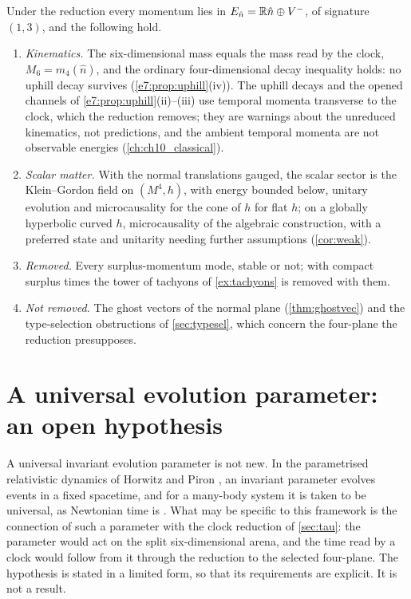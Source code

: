Under the reduction every momentum lies in $E_{\hat n}=\mathbb{R}\hat n\oplus V^-$, of signature $(1,3)$, and the following hold.
\begin{enumerate}[label=(\roman*),leftmargin=2.2em]
\item \emph{Kinematics.} The six-dimensional mass equals the mass read by the clock, $M_6=m_4(\hat n)$, and the ordinary four-dimensional
decay inequality holds: no uphill decay survives (\cref{e7:prop:uphill}(iv)). The uphill decays and the opened channels of
\cref{e7:prop:uphill}(ii)--(iii) use temporal momenta transverse to the clock, which the reduction removes; they are warnings about the unreduced
kinematics, not predictions, and the ambient temporal momenta are not observable energies (\cref{ch:ch10_classical}).
\item \emph{Scalar matter.} With the normal translations gauged, the scalar sector is the Klein--Gordon field on $(M^4,h)$, with energy bounded
below, unitary evolution and microcausality for the cone of $h$ for flat $h$; on a globally hyperbolic curved $h$, microcausality of the algebraic
construction, with a preferred state and unitarity needing further assumptions (\cref{cor:weak}).
\item \emph{Removed.} Every surplus-momentum mode, stable or not; with compact surplus times the tower of tachyons of \cref{ex:tachyons} is
removed with them.
\item \emph{Not removed.} The ghost vectors of the normal plane (\cref{thm:ghostvec}) and the type-selection obstructions of
\cref{sec:typesel}, which concern the four-plane the reduction presupposes.
\end{enumerate}

\section{A universal evolution parameter: an open hypothesis}
\label{sec:universaltau}

A universal invariant evolution parameter is not new. In the parametrised relativistic dynamics of Horwitz and Piron \cite{HorwitzPiron73},
an invariant parameter evolves events in a fixed spacetime, and for a many-body system it is taken to be universal, as Newtonian time is
\cite{HorwitzPiron73,Horwitz20}. What may be specific to this framework is the connection of
such a parameter with the clock reduction of \cref{sec:tau}: the parameter would act on the split six-dimensional arena, and the time read
by a clock would follow from it through the reduction to the selected four-plane. The hypothesis is stated in a limited form, so that its
requirements are explicit. It is not a result.

